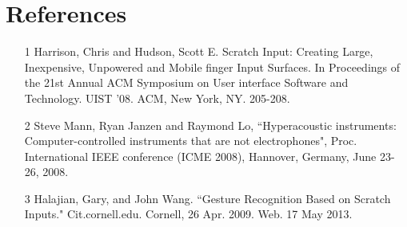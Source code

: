 \documentclass[12pt]{article}
\begin{document}
\section{References}
\begin{itemize}
\item[1] Harrison, Chris and Hudson, Scott E. Scratch Input: Creating Large, Inexpensive, Unpowered and Mobile finger Input Surfaces. In Proceedings of the 21st Annual ACM Symposium on User interface Software and Technology. UIST '08. ACM, New York, NY. 205-208.
\item[2] Steve Mann, Ryan Janzen and Raymond Lo, ``Hyperacoustic instruments: Computer-controlled instruments that are not electrophones", Proc. International IEEE conference (ICME 2008), Hannover, Germany, June 23-26, 2008.

\item[3] Halajian, Gary, and John Wang. ``Gesture Recognition Based on Scratch Inputs." Cit.cornell.edu. Cornell, 26 Apr. 2009. Web. 17 May 2013.
\end{itemize}
\end{document}
